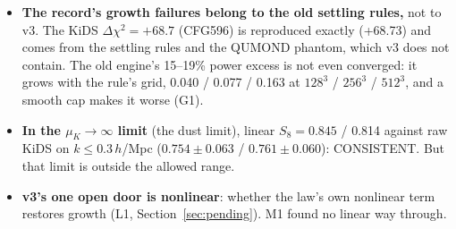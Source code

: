 \documentclass[10pt]{article}
\begin{document}
\begin{itemize}
\item \textbf{The record's growth failures belong to the old settling rules,} not to v3. The KiDS $\Delta\chi^2=+68.7$ (CFG596) is reproduced exactly (+68.73) and comes from the settling rules and the QUMOND phantom, which v3 does not contain. The old engine's 15--19\% power excess is not even converged: it grows with the rule's grid, 0.040 / 0.077 / 0.163 at $128^3$ / $256^3$ / $512^3$, and a smooth cap makes it worse (G1).
\item \textbf{In the $\mu_K\to\infty$ limit} (the dust limit), linear $S_8=0.845$ / 0.814 against raw KiDS on $k\le0.3\,h$/Mpc ($0.754\pm0.063$ / $0.761\pm0.060$): CONSISTENT. But that limit is outside the allowed range.
\item \textbf{v3's one open door is nonlinear}: whether the law's own nonlinear term restores growth (L1, Section~\ref{sec:pending}). M1 found no linear way through.
\end{itemize}
\end{document}
